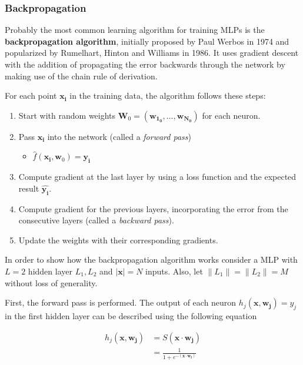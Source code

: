 \subsubsection{Backpropagation}

Probably the most common learning algorithm for training MLPs is the \textbf{backpropagation algorithm}, initially proposed by Paul Werbos in 1974 and popularized by Rumelhart, Hinton and Williams in 1986.
It uses gradient descent with the addition of propagating the error backwards through the network by making use of the chain rule of derivation.

For each point $\bm{x_i}$ in the training data, the algorithm follows these steps:

\begin{enumerate}
    \item Start with random weights $\bm{W}_0 = (\bm{w_{1_0}}, \dots, \bm{w_{N_0}})$ for each neuron.
    \item Pass $\bm{x_i}$ into the network (called a \textit{forward pass})
    \begin{itemize}
        \item $\hat{f}(\bm{x_i}, \bm{w}_0) = \bm{y_i}$
    \end{itemize}
    \item Compute gradient at the last layer by using a loss function and the expected result $\hat{\bm{y_i}}$.
    \item Compute gradient for the previous layers, incorporating the error from the consecutive layers (called a \textit{backward pass}).
    \item Update the weights with their corresponding gradients.
\end{enumerate}

In order to show how the backpropagation algorithm works consider a MLP with $L=2$ hidden layer $L_1, L_2$ and $\left| \bm{x} \right| = N$ inputs.
Also, let $\lVert L_1 \rVert = \lVert L_2 \rVert = M$ without loss of generality.

First, the forward pass is performed.
The output of each neuron $h_j(\bm{x}, \bm{w_j}) = y_j$ in the first hidden layer can be described using the following equation

\begin{equation}
    \begin{split}
        h_j(\bm{x}, \bm{w_j}) 
        &= S(\bm{x} \cdot \bm{w_j}) \\
        &= \frac{1}{1 + e^{-(\bm{x} \cdot \bm{w_j})}}
    \end{split}
\end{equation}

